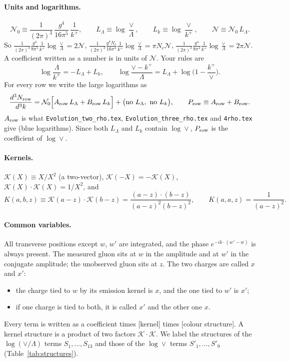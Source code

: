 \documentclass[10pt]{article}
\numberwithin{equation}{section}
\newcommand{\KK}{\mathcal K}
\newcommand{\NN}{\mathcal N}
\newcommand{\NO}{\mathcal N_0}
\newcommand{\LL}{L_\Lambda}
\newcommand{\Lk}{L_k}
\begin{document}
\paragraph{Units and logarithms.}
\begin{equation}
\NO\equiv\frac{1}{(2\pi)^3}\,\frac{g^4}{16\pi^5}\,\frac{1}{k^+},\qquad \LL\equiv\log\frac{\vee}{\Lambda},\qquad\Lk\equiv\log\frac{\vee}{k^+},\qquad \NN\equiv\NO\,\LL .
\end{equation}
So $\frac{1}{(2\pi)^3}\frac{g^4}{8\pi^5}\frac1{k^+}\log\frac\vee\Lambda=2\NN$, $\frac{1}{(2\pi)^3}\frac{g^4N_c}{16\pi^4}\frac1{k^+}\log\frac\vee\Lambda=\pi N_c\NN$, $\frac{1}{(2\pi)^3}\frac{g^4}{8\pi^4}\frac1{k^+}\log\frac\vee\Lambda=2\pi\NN$. A coefficient written as a number is in units of $\NN$. Your rules are
\begin{equation}
\log\frac{\Lambda}{k^+}=-\LL+\Lk,\qquad \log\frac{\vee-k^+}{\Lambda}=\LL+\log\Big(1-\frac{k^+}{\vee}\Big).
\end{equation}
For every row we write the large logarithms as
\begin{equation}
\frac{d^3N_{\rm row}}{d^3k}=\NO\Big[A_{\rm row}\,\LL+B_{\rm row}\,\Lk\Big]+\big(\text{no }\LL,\ \text{no }\Lk\big),\qquad P_{\rm row}\equiv A_{\rm row}+B_{\rm row}.
\label{eq:ABP}
\end{equation}
$A_{\rm row}$ is what \texttt{Evolution\_two\_rho.tex}, \texttt{Evolution\_three\_rho.tex} and \texttt{4rho.tex} give (blue logarithms). Since both $\LL$ and $\Lk$ contain $\log\vee$, $P_{\rm row}$ is the coefficient of $\log\vee$.

\paragraph{Kernels.} $\KK(X)\equiv X/X^2$ (a two-vector), $\KK(-X)=-\KK(X)$, $\KK(X)\cdot\KK(X)=1/X^2$, and
\begin{equation}
K(a,b,z)\equiv\KK(a-z)\cdot\KK(b-z)=\frac{(a-z)\cdot(b-z)}{(a-z)^2(b-z)^2},\qquad K(a,a,z)=\frac{1}{(a-z)^2}.
\end{equation}

\paragraph{Common variables.} All transverse positions except $w$, $w'$ are integrated, and the phase $e^{-ik\cdot(w'-w)}$ is always present. The measured gluon sits at $w$ in the amplitude and at $w'$ in the conjugate amplitude; the unobserved gluon sits at $z$. The two charges are called $x$ and $x'$:
\begin{itemize}
\item the charge tied to $w$ by its emission kernel is $x$, and the one tied to $w'$ is $x'$;
\item if one charge is tied to both, it is called $x'$ and the other one $x$.
\end{itemize}
Every term is written as a coefficient times [kernel] times [colour structure]. A kernel structure is a product of two factors $\KK\cdot\KK$. We label the structures of the $\log(\vee/\Lambda)$ terms $S_1,\dots,S_{13}$ and those of the $\log\vee$ terms $S'_1,\dots,S'_{9}$ (Table~\ref{tab:structures}).
\end{document}
